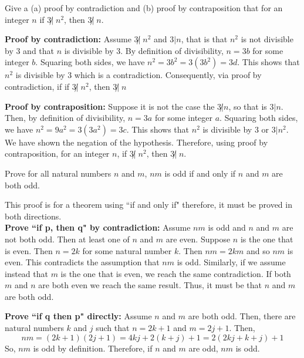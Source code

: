 \begin{questions}
 Give a (a) proof by contradiction and (b) proof by contraposition that 
for an integer $n$ if $3\not|\; n^2$, then $3\not|\; n$. 
\ifprintanswers
        \vspace{-10pt}
    \fi
\begin{solution}
  \textbf{Proof by contradiction:} Assume $3\not|\; n^2$ and $3 | n$, that is that $n^2$ is not divisible by 3 and that $n$ is divisible by 3.  By definition of divisibility, $n = 3b$ for some integer $b$.  Squaring both sides, we have $n^2 = 3b^2 = 3(3b^2) = 3d$. This shows that $n^2$ is divisible by 3 which is a contradiction.  Consequently, via proof by contradiction, if if $3\not|\; n^2$, then $3\not|\; n$  

  \textbf{Proof by contraposition:} Suppose it is not the case the $3 \not| n$, so that is $3 | n$.  Then, by definition of divisibility, $n = 3a$ for some integer $a$.   Squaring both sides, we have $n^2 = 9a^2 = 3(3a^2) = 3c$.  This shows that $n^2$ is divisible by 3 or $3 | n^2$.  We have shown the negation of the hypothesis.   
  Therefore, using proof by contraposition, for an integer $n$, if $3\not|\; n^2$, then $3\not|\; n$.
\end{solution}




 Prove for all natural numbers $n$ and $m$, $nm$ is odd if
and only if $n$ and $m$ are both odd.
    \ifprintanswers
        \vspace{-10pt}
    \fi
\begin{solution}
     This proof is for a theorem using ``if and only if" therefore,
     it must be proved in both directions.  \\
    \textbf{Prove ``if p, then q" by contradiction:} Assume $nm$ is
    odd and $n$ and $m$ are not both odd.  Then at least one of $n$
    and $m$ are even.  Suppose $n$ is the one that is even. Then
    $n=2k$ for some natural number $k$.  Then $nm = 2km$ and so $nm$
    is even.  This contradicts the assumption that $nm$ is odd.
    Similarly, if we assume instead that $m$ is the one that is even,
    we reach the same contradiction.   If both $m$ and $n$ are both
    even we reach the same result.  Thus, it must be that $n$ and
    $m$ are both odd.

    \smallskip
    \textbf{Prove ``if q then p" directly:} Assume $n$ and $m$ are
    both odd.  Then, there are natural numbers $k$ and $j$ such
    that $n = 2k+1$ and $m=2j+1$.  Then,
    \[ nm = (2k+1)(2j+1) = 4kj + 2(k+j) +1 = 2(2kj +k + j) +1 \]
    So, $nm$ is odd by definition. Therefore, if $n$ and $m$ are
    odd, $nm$ is odd.


\end{solution}
\end{questions}
